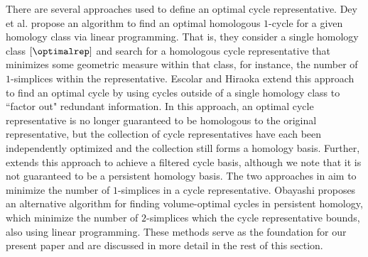 

There are several approaches used to define an optimal cycle representative. Dey et al. \cite{dey2011optimal} propose an algorithm to find an optimal homologous $1$-cycle for a given homology class via linear programming. That is, they consider a single homology class $[\optimalrep]$ and search for a homologous cycle representative that minimizes some geometric measure within that class, for instance, the number of $1$-simplices within the representative. Escolar and Hiraoka \cite{Escolar2016} extend this approach to find an optimal cycle by using cycles outside of a single homology class to ``factor out" redundant information. In this approach, an optimal cycle representative is no longer guaranteed to be homologous to the original representative, but the collection of cycle representatives have each been independently optimized and the collection still forms a homology basis. Further, \cite{Escolar2016} extends this approach to achieve a filtered cycle basis, although we note that it is not guaranteed to be a persistent homology basis. The two approaches in \cite{dey2011optimal,Escolar2016} aim to minimize the number of $1$-simplices in a cycle representative. Obayashi \cite{Obayashi2018} proposes an alternative algorithm for finding volume-optimal cycles in persistent homology, which minimize the number of $2$-simplices which the cycle representative bounds, also using linear programming. These methods serve as the foundation for our present paper and are discussed in more detail in the rest of this section.  




